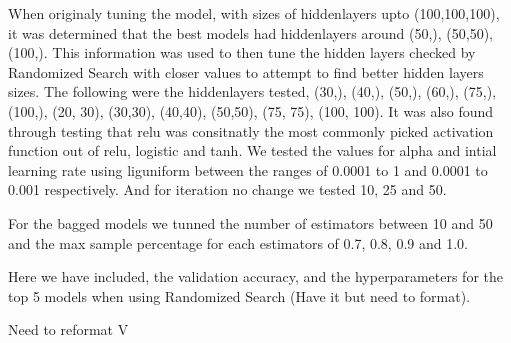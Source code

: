 When originaly tuning the model, with sizes of hiddenlayers upto (100,100,100), it was determined that the best models had hiddenlayers
around (50,), (50,50), (100,). This information was used to then tune the hidden layers checked by Randomized Search with closer values
to attempt to find better hidden layers sizes.
The following were the hiddenlayers tested,  
(30,), (40,), (50,), (60,), (75,), (100,), (20, 30), (30,30), (40,40), (50,50), (75, 75), (100, 100).
It was also found through testing that relu was consitnatly the most commonly picked activation function out of relu, logistic and tanh.
We tested the values for alpha and intial learning rate using liguniform between the ranges of 0.0001 to 1 and 0.0001 to 0.001 respectively.
And for iteration no change we tested 10, 25 and 50.

For the bagged models we tunned the number of estimators between 10 and 50 and the max sample percentage for each estimators of 0.7, 0.8, 0.9 and 1.0.

Here we have included, the validation accuracy, and the hyperparameters for the top 5 models when using Randomized Search (Have it but need to format). 


Need to reformat V 

